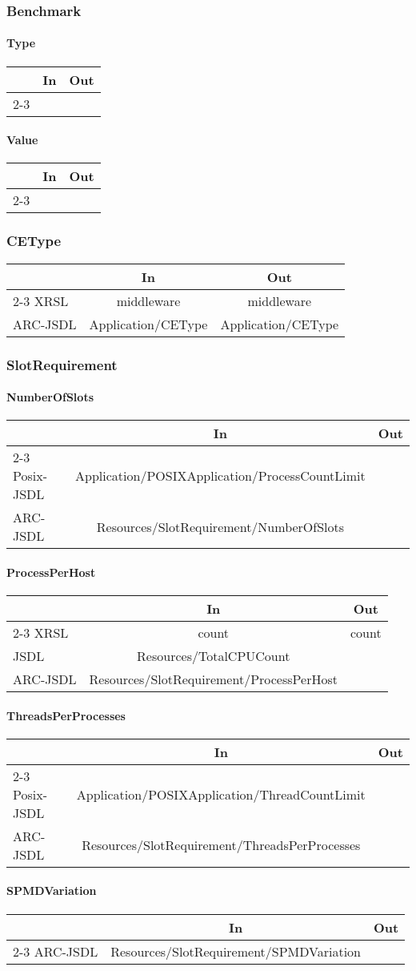 \documentclass{article}
\newcommand{\subsubsubsection}[1]{\paragraph{#1}}
\newenvironment{inouttabular}%
{\begin{center}\begin{tabular}{l>{\ttfamily\footnotesize}c>{\ttfamily\footnotesize}c}%
\toprule
& \textnormal{\normalsize{In}} & \textnormal{\normalsize{Out}}\\ \cmidrule{2-3}}
{\bottomrule\end{tabular}\end{center}}
\begin{document}
\subsubsection{Benchmark}
\subsubsubsection{Type}
\begin{inouttabular}
\end{inouttabular}

\subsubsubsection{Value}
\begin{inouttabular}
\end{inouttabular}

\subsubsection{CEType}
\begin{inouttabular}
XRSL & middleware & middleware\\
ARC-JSDL & Application/CEType & Application/CEType\\
\end{inouttabular}

\subsubsection{SlotRequirement}
\subsubsubsection{NumberOfSlots}
\begin{inouttabular}
Posix-JSDL & Application/POSIXApplication/ProcessCountLimit &\\
ARC-JSDL & Resources/SlotRequirement/NumberOfSlots &\\
\end{inouttabular}

\subsubsubsection{ProcessPerHost}
\begin{inouttabular}
XRSL & count & count\\
JSDL & Resources/TotalCPUCount & \\
ARC-JSDL & Resources/SlotRequirement/ProcessPerHost &\\
\end{inouttabular}

\subsubsubsection{ThreadsPerProcesses}
\begin{inouttabular}
Posix-JSDL & Application/POSIXApplication/ThreadCountLimit &\\
ARC-JSDL & Resources/SlotRequirement/ThreadsPerProcesses &\\
\end{inouttabular}

\subsubsubsection{SPMDVariation}
\begin{inouttabular}
ARC-JSDL & Resources/SlotRequirement/SPMDVariation &\\
\end{inouttabular}
\end{document}
